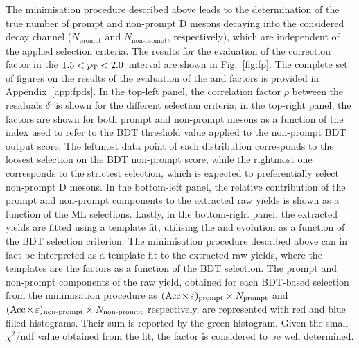 The minimisation procedure described above leads to the determination of the true number of prompt and non-prompt D mesons decaying into the considered decay channel ($N_\mathrm{prompt}$ and $N_\mathrm{non\text{-}prompt}$, respectively), which are independent of the applied selection criteria. The results for the evaluation of the \fpds correction factor in the $1.5<p_\mathrm{T}<2.0$~\gevc interval are shown in Fig.~\ref{fig:fp}. The complete set of figures on the results of the evaluation of the \fpds and \fpdpl factors is provided in Appendix~\ref{app:fpds}. In the top-left panel, the correlation factor $\rho$ between the residuals $\delta^\mathrm{i}$ is shown for the different selection criteria; in the top-right panel, the \aeff factors are shown for both prompt and non-prompt \ds mesons as a function of the index used to refer to the BDT threshold value applied to the non-prompt BDT output score. The leftmost data point of each distribution corresponds to the loosest selection on the BDT non-prompt score, while the rightmost one corresponds to the strictest selection, which is expected to preferentially select non-prompt D mesons. In the bottom-left panel, the relative contribution of the prompt and non-prompt components to the extracted \ds raw yields is shown as a function of the ML selections. Lastly, in the bottom-right panel, the extracted yields are fitted using a template fit, utilising the \aeffpds and \aeffnpds evolution as a function of the BDT selection criterion. The minimisation procedure described above can in fact be interpreted as a template fit to the extracted raw yields, where the templates are the \aeff factors as a function of the BDT selection. The prompt and non-prompt components of the raw yield, obtained for each BDT-based selection from the minimisation procedure as \mbox{$(\mathrm{Acc}\mkern-2mu\times\mkern-2mu\varepsilon)_\mathrm{prompt}\times N_\mathrm{prompt}$} and $(\mathrm{Acc}\mkern-2mu\times\mkern-2mu\varepsilon)_\mathrm{non\text{-}prompt}\times N_\mathrm{non\text{-}prompt}$ respectively, are represented with red and blue filled histograms. Their sum is reported by the green histogram. Given the small $\chi^2$/ndf value obtained from the fit, the \fp factor is considered to be well determined. 
